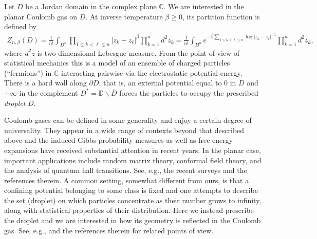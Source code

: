 \documentclass{article}
\numberwithin{equation}{section}
\numberwithin{figure}{section}
\theoremstyle{plain}
\theoremstyle{plain}
\numberwithin{thm}{section}
\theoremstyle{remark}
\newcommand{\C}{\mathbb{C}}
\newcommand{\D}{\mathbb{D}}
\let \le \leqslant
\let \ge \geqslant
\begin{document}
Let $D$ be a Jordan domain in the complex plane $\mathbb{C}$. We are interested in the planar Coulomb gas on $D$. At inverse temperature $\beta \ge 0$, its partition function is defined by
\begin{align}\label{CGpartfcn}
Z_{n, \beta}(D) =\frac 1{n!}\int_{D^n}\prod_{1\le k < \ell \le  n}|z_k-z_\ell|^{\beta} \prod_{k=1}^n d^2z_k=\frac 1{n!}\int_{D^n}e^{- \beta \sum_{1 \le k < \ell \le n}\log|z_k-z_\ell|^{-1}}\prod_{k=1}^nd^2z_k,
\end{align}
where $d^2z$ is two-dimensional Lebesgue measure. From the point of view of statistical mechanics this is a model of an ensemble of charged particles (``fermions'') in $\C$ interacting pairwise via the electrostatic potential energy. There is a hard wall along $\partial D$, that is, an external potential equal to $0$ in $D$ and $ + \infty$ in the complement $D^*= \D \smallsetminus \overline{D}$ forces the particles to occupy the prescribed \emph{droplet} $D$. 

Coulomb gases can be defined in some generality and enjoy a certain degree of universality. They appear in a wide range of contexts beyond that described above and the induced Gibbs probability measures as well as free energy expansions have received substantial attention in recent years. In the planar case, important applications include random matrix theory, conformal field theory, and the analysis of quantum hall transitions. See, e.g., the recent surveys \cite{Serfaty18, lewin} and the references therein. A common setting, somewhat different from ours, is that a confining potential belonging to some class is fixed and one attempts to describe the set (droplet) on which particles concentrate as their number grows to infinity, along with statistical properties of their distribution. Here we instead prescribe the droplet and we are interested in how its geometry is reflected in the Coulomb gas. See, e.g., \cite{Ber} and the references therein for related points of view. 
\end{document}
